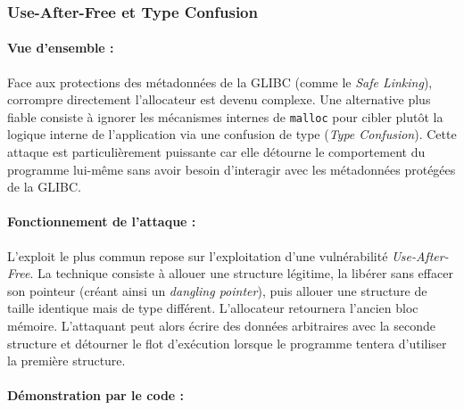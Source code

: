 \subsubsection{Use-After-Free et Type Confusion}

\paragraph{Vue d'ensemble :}
Face aux protections des métadonnées de la GLIBC (comme le \textit{Safe Linking}), corrompre directement l'allocateur est devenu complexe. Une alternative plus fiable consiste à ignorer les mécanismes internes de \texttt{malloc} pour cibler plutôt la logique interne de l'application via une confusion de type (\textit{Type Confusion}). Cette attaque est particulièrement puissante car elle détourne le comportement du programme lui-même sans avoir besoin d'interagir avec les métadonnées protégées de la GLIBC.

\paragraph{Fonctionnement de l'attaque :}
L'exploit le plus commun repose sur l'exploitation d'une vulnérabilité \textit{Use-After-Free}. La technique consiste à allouer une structure légitime, la libérer sans effacer son pointeur (créant ainsi un \textit{dangling pointer}), puis allouer une structure de taille identique mais de type différent. L'allocateur retournera l'ancien bloc mémoire. L'attaquant peut alors écrire des données arbitraires avec la seconde structure et détourner le flot d'exécution lorsque le programme tentera d'utiliser la première structure.

\paragraph{Démonstration par le code :}


